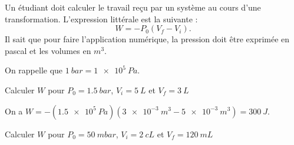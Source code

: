 

\hauteurLargeurCadreReponse		{8mm}{5cm}
\initialisationEntrainement


\debutEntrainement


Un étudiant doit calculer le travail reçu par un système au cours d'une transformation. L'expression littérale est la suivante : 
\[
W=-P_0\left(V_f-V_i\right).
\]
Il sait que pour faire l'application numérique, la pression doit être exprimée en pascal et les volumes en $m^3$. 

On rappelle que $\SI{1}{bar} = \SI{1e5}{Pa}$.


\begin{enonce}
	 Calculer $W$ pour $P_0=\SI{1,5}{bar}$, $V_i=\SI{5}{L}$ et $V_f=\SI{3}{L}$
\end{enonce}


\begin{corrige}
	On a $W=-\left(\SI{1,5e5}{Pa}\right)\left(\SI{3e-3}{m^3}-\SI{5e-3}{m^3}\right)=\SI{300}{J}$.
\end{corrige}

\begin{enonce}
	Calculer $W$ pour $P_0=\SI{50}{mbar}$, $V_i=\SI{2}{cL}$ et $V_f=\SI{120}{mL}$
\end{enonce}

